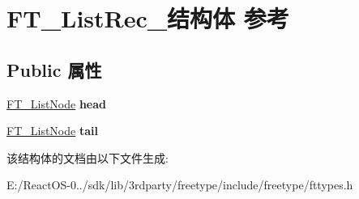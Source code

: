 \hypertarget{struct_f_t___list_rec__}{}\section{F\+T\+\_\+\+List\+Rec\+\_\+结构体 参考}
\label{struct_f_t___list_rec__}
\subsection*{Public 属性}
\begin{DoxyCompactItemize}
\item 
\mbox{\label{struct_f_t___list_rec___a09ed35c2bcdc1c3acd12ff4650dfdeb9}} 
\hyperlink{struct_f_t___list_node_rec__}{F\+T\+\_\+\+List\+Node} {\bfseries head}
\item 
\mbox{\label{struct_f_t___list_rec___a4664761f0ab2af3d48231b00cd978b23}} 
\hyperlink{struct_f_t___list_node_rec__}{F\+T\+\_\+\+List\+Node} {\bfseries tail}
\end{DoxyCompactItemize}


该结构体的文档由以下文件生成\+:\begin{DoxyCompactItemize}
\item 
E\+:/\+React\+O\+S-\/0../sdk/lib/3rdparty/freetype/include/freetype/fttypes.\+h\end{DoxyCompactItemize}

